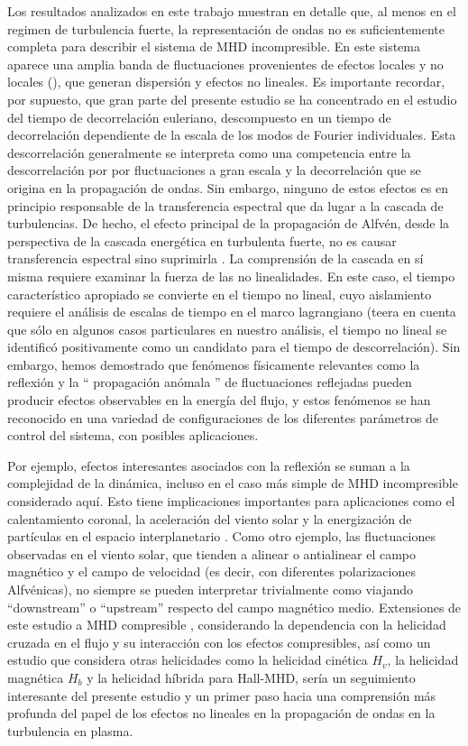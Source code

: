 Los resultados analizados en este trabajo muestran en detalle que, al
menos en el regimen de turbulencia fuerte, la representación de ondas
no es suficientemente completa para describir el sistema de MHD
incompresible. En este sistema aparece una amplia banda de
fluctuaciones provenientes de efectos locales y no locales
(\sweeping), que generan dispersión y efectos no lineales. Es
importante recordar, por supuesto, que gran parte del presente estudio
se ha concentrado en el estudio del tiempo de decorrelación euleriano,
descompuesto en un tiempo de decorrelación dependiente de la escala de
los modos de Fourier individuales. Esta descorrelación generalmente se
interpreta como una competencia entre la descorrelación por \sweeping
por fluctuaciones a gran escala y la decorrelación que se origina en
la propagación de ondas. Sin embargo, ninguno de estos efectos es en
principio responsable de la transferencia espectral que da lugar a la
cascada de turbulencias. De hecho, el efecto principal de la
propagación de Alfvén, desde la perspectiva de la cascada energética
en turbulenta fuerte, no es causar transferencia espectral sino
suprimirla \cite{shebalin_1983_anisotropy}. La comprensión de la
cascada en sí misma requiere examinar la fuerza de las no
linealidades. En este caso, el tiempo característico apropiado se
convierte en el tiempo no lineal, cuyo aislamiento requiere el
análisis de escalas de tiempo en el marco lagrangiano
\cite{kraichnan_1964_kolmogorov} (teera en cuenta que sólo en algunos
casos particulares en nuestro análisis, el tiempo no lineal se
identificó positivamente como un candidato para el tiempo de
descorrelación). Sin embargo, hemos demostrado que fenómenos
físicamente relevantes como la reflexión y la `` propagación anómala
'' de fluctuaciones reflejadas pueden producir efectos observables en
la energía del flujo, y estos fenómenos se han reconocido en una
variedad de configuraciones de los diferentes parámetros de control
del sistema, con posibles aplicaciones.

Por ejemplo, efectos interesantes asociados con la reflexión se suman
a la complejidad de la dinámica, incluso en el caso más simple de MHD
incompresible considerado aquí. Esto tiene implicaciones importantes
para aplicaciones como el calentamiento coronal, la aceleración del
viento solar y la energización de partículas en el espacio
interplanetario \cite{velli_1993_propagation, matthaeus_1999_coronal}.
Como otro ejemplo, las fluctuaciones observadas en el viento solar,
que tienden a alinear o antialinear el campo magnético y el campo de
velocidad (es decir, con diferentes polarizaciones Alfvénicas), no
siempre se pueden interpretar trivialmente como viajando
``downstream'' o ``upstream'' respecto del campo magnético medio.
Extensiones de este estudio a MHD compresible
\cite{andres_2017_interplay}, considerando la dependencia con la
helicidad cruzada en el flujo y su interacción con los efectos
compresibles, así como un estudio que considera otras helicidades como
la helicidad cinética $H_v$, la helicidad magnética $H_b$ y la
helicidad híbrida para Hall-MHD, sería un seguimiento interesante del
presente estudio y un primer paso hacia una comprensión más profunda
del papel de los efectos no lineales en la propagación de ondas en la
turbulencia en plasma.





